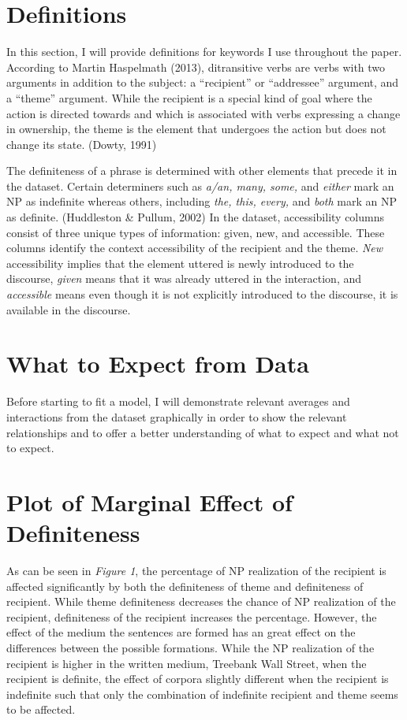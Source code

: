 \documentclass[english,floatsintext,man]{apa6}
\theoremstyle{definition}
\theoremstyle{definition}
\theoremstyle{definition}
\theoremstyle{remark}
\begin{document}
\section{Definitions}\label{definitions}

In this section, I will provide definitions for keywords I use
throughout the paper. According to Martin Haspelmath (2013),
ditransitive verbs are verbs with two arguments in addition to the
subject: a \enquote{recipient} or \enquote{addressee} argument, and a
\enquote{theme} argument. While the recipient is a special kind of goal
where the action is directed towards and which is associated with verbs
expressing a change in ownership, the theme is the element that
undergoes the action but does not change its state. (Dowty, 1991)

The definiteness of a phrase is determined with other elements that
precede it in the dataset. Certain determiners such as \emph{a/an, many,
some,} and \emph{either} mark an NP as indefinite whereas others,
including \emph{the, this, every,} and \emph{both} mark an NP as
definite. (Huddleston \& Pullum, 2002) In the dataset, accessibility
columns consist of three unique types of information: given, new, and
accessible. These columns identify the context accessibility of the
recipient and the theme. \emph{New} accessibility implies that the
element uttered is newly introduced to the discourse, \emph{given} means
that it was already uttered in the interaction, and \emph{accessible}
means even though it is not explicitly introduced to the discourse, it
is available in the discourse.

\section{What to Expect from Data}\label{what-to-expect-from-data}

Before starting to fit a model, I will demonstrate relevant averages and
interactions from the dataset graphically in order to show the relevant
relationships and to offer a better understanding of what to expect and
what not to expect.

\section{Plot of Marginal Effect of
Definiteness}\label{plot-of-marginal-effect-of-definiteness}

As can be seen in \emph{Figure 1}, the percentage of NP realization of
the recipient is affected significantly by both the definiteness of
theme and definiteness of recipient. While theme definiteness decreases
the chance of NP realization of the recipient, definiteness of the
recipient increases the percentage. However, the effect of the medium
the sentences are formed has an great effect on the differences between
the possible formations. While the NP realization of the recipient is
higher in the written medium, Treebank Wall Street, when the recipient
is definite, the effect of corpora slightly different when the recipient
is indefinite such that only the combination of indefinite recipient and
theme seems to be affected.
\end{document}
